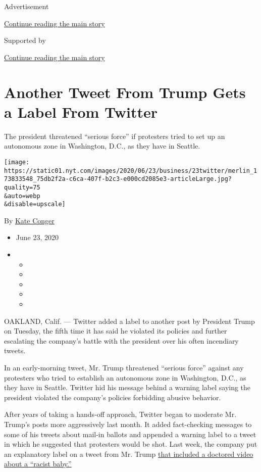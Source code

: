 Advertisement

\protect\hyperlink{after-top}{Continue reading the main story}

Supported by

\protect\hyperlink{after-sponsor}{Continue reading the main story}

\hypertarget{another-tweet-from-trump-gets-a-label-from-twitter}{%
\section{Another Tweet From Trump Gets a Label From
Twitter}\label{another-tweet-from-trump-gets-a-label-from-twitter}}

The president threatened ``serious force'' if protesters tried to set up
an autonomous zone in Washington, D.C., as they have in Seattle.

\texttt{[image: https://static01.nyt.com/images/2020/06/23/business/23twitter/merlin\_173833548\_75db2f2a-c6ca-407f-b2c3-e000cd2085e3-articleLarge.jpg?quality=75\\\&auto=webp\\\&disable=upscale]}

By \href{https://www.nytimes.com/by/kate-conger}{Kate Conger}

\begin{itemize}
\item
  June 23, 2020
\item
  \begin{itemize}
  \item
  \item
  \item
  \item
  \item
  \end{itemize}
\end{itemize}

OAKLAND, Calif. --- Twitter added a label to another post by President
Trump on Tuesday, the fifth time it has said he violated its policies
and further escalating the company's battle with the president over his
often incendiary tweets.

In an early-morning tweet, Mr. Trump threatened ``serious force''
against any protesters who tried to establish an autonomous zone in
Washington, D.C., as they have in Seattle. Twitter hid his message
behind a warning label saying the president violated the company's
policies forbidding abusive behavior.

After years of taking a hands-off approach, Twitter began to moderate
Mr. Trump's posts more aggressively last month. It added fact-checking
messages to some of his tweets about mail-in ballots and appended a
warning label to a tweet in which he suggested that protesters would be
shot. Last week, the company put an explanatory label on a tweet from
Mr. Trump
\href{https://www.nytimes.com/2020/06/18/technology/trump-tweet-baby-manipulated.html}{that
included a doctored video about a ``racist baby.''}

